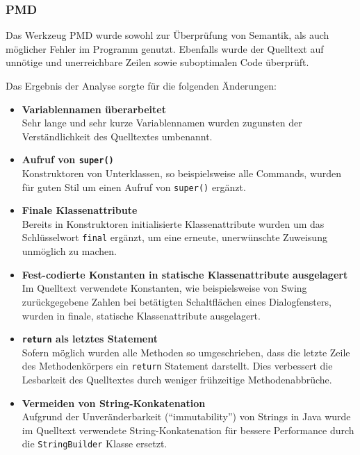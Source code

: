 \documentclass[parskip=full,11pt,twoside]{scrartcl}
\begin{document}
\subsubsection{PMD}

Das Werkzeug PMD wurde sowohl zur Überprüfung von Semantik, als auch möglicher Fehler im Programm genutzt. Ebenfalls wurde der Quelltext auf unnötige und unerreichbare Zeilen sowie suboptimalen Code überprüft.

Das Ergebnis der Analyse sorgte für die folgenden Änderungen:

\begin{itemize}
  \item \textbf{Variablennamen überarbeitet}\\
        Sehr lange und sehr kurze Variablennamen wurden zugunsten der Verständlichkeit des Quelltextes umbenannt.
  \item \textbf{Aufruf von \texttt{super()}}\\
        Konstruktoren von Unterklassen, so beispielsweise alle Commands, wurden für guten Stil um einen Aufruf von \texttt{super()} ergänzt.
  \item \textbf{Finale Klassenattribute}\\
        Bereits in Konstruktoren initialisierte Klassenattribute wurden um das Schlüsselwort \texttt{final} ergänzt, um eine erneute, unerwünschte Zuweisung unmöglich zu machen.
  \item \textbf{Fest-codierte Konstanten in statische Klassenattribute ausgelagert}\\
        Im Quelltext verwendete Konstanten, wie beispielsweise von Swing zurückgegebene Zahlen bei betätigten Schaltflächen eines Dialogfensters, wurden in finale, statische Klassenattribute ausgelagert.
  \item \textbf{\texttt{return} als letztes Statement}\\
        Sofern möglich wurden alle Methoden so umgeschrieben, dass die letzte Zeile des Methodenkörpers ein \texttt{return} Statement darstellt. Dies verbessert die Lesbarkeit des Quelltextes durch weniger frühzeitige Methodenabbrüche.
  \item \textbf{Vermeiden von String-Konkatenation}\\
        Aufgrund der Unveränderbarkeit (\enquote{immutability}) von Strings in Java wurde im Quelltext verwendete String-Konkatenation für bessere Performance durch die \texttt{StringBuilder} Klasse ersetzt.
\end{itemize}
\end{document}
